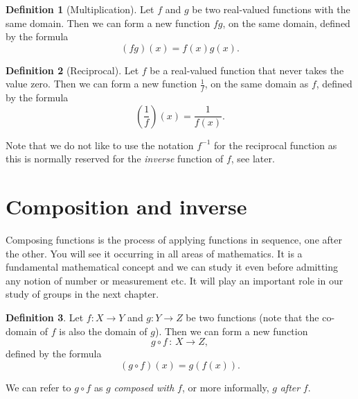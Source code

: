 \documentclass[extrafontsizes, twoside, a4paper]{memoir}
\theoremstyle{plain}%
\theoremstyle{definition}
\newtheorem{defn}{Definition}[chapter]
\theoremstyle{remark}
\begin{document}
\begin{defn}[Multiplication]
Let $f$ and $g$ be two real-valued functions with the same domain. Then we can form a new function $fg$, on the same domain, defined by the formula
$$ \left ( fg \right ) (x) = f(x) g(x).$$
\end{defn}

\begin{defn}[Reciprocal]
Let $f$ be a real-valued function that never takes the value zero. Then we can form a new function $\frac{1}{f}$, on the same domain as $f$, defined by the formula
$$ \left ( \frac{1}{f} \right ) (x) = \frac{1}{f(x)}.$$
\end{defn}

Note that we do not like to use the notation $f^{-1}$ for the reciprocal function as this is normally reserved for the \textit{inverse} function of $f$, see later.

\section{Composition and inverse}
Composing functions is the process of applying functions in sequence, one after the other. You will see it occurring in all areas of mathematics. It is a fundamental mathematical concept and we can study it even before admitting any notion of number or measurement etc. It will play an important role in our study of groups in the next chapter.

\begin{defn}
Let $f:X \to Y$ and $g:Y \to Z$ be two functions (note that the co-domain of $f$ is also the domain of $g$). Then we can form a new function
$$ g \circ f \, : \, X \to Z ,$$
defined by the formula
$$ \left ( g \circ f \right ) (x) = g(f(x)) .$$
\end{defn}
We can refer to $g \circ f$ as $g$ \textit{composed with } $f$, or more informally, $g$ \textit{after} $f$.
\end{document}
